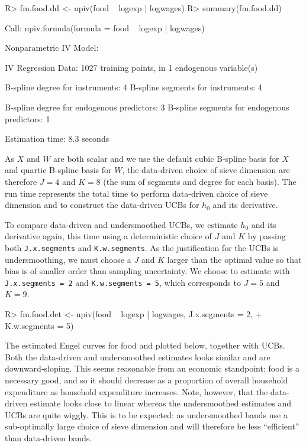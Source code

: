\documentclass[
]{jss}
\begin{document}
\begin{CodeChunk}
\begin{CodeInput}
R> fm.food.dd <- npiv(food ~ logexp | logwages)
R> summary(fm.food.dd)
\end{CodeInput}
\begin{CodeOutput}
Call:
npiv.formula(formula = food ~ logexp | logwages)

Nonparametric IV Model:

IV Regression Data: 1027 training points, in 1 endogenous variable(s)

B-spline degree for instruments:             4
B-spline segments for instruments:           4

B-spline degree for endogenous predictors:   3
B-spline segments for endogenous predictors: 1

Estimation time: 8.3 seconds
\end{CodeOutput}
\end{CodeChunk}

As \(X\) and \(W\) are both scalar and we use the default cubic B-spline
basis for \(X\) and quartic B-spline basis for \(W\), the data-driven
choice of sieve dimension are therefore \(J = 4\) and \(K = 8\) (the sum
of segments and degree for each basis). The run time represents the
total time to perform data-driven choice of sieve dimension and to
construct the data-driven UCBs for \(h_0\) and its derivative.

To compare data-driven and undersmoothed UCBs, we estimate \(h_0\) and
its derivative again, this time using a deterministic choice of \(J\)
and \(K\) by passing both \texttt{J.x.segments} and
\texttt{K.w.segments}. As the justification for the UCBs is
undersmoothing, we must choose a \(J\) and \(K\) larger than the optimal
value so that bias is of smaller order than sampling uncertainty. We
choose to estimate with \texttt{J.x.segments\ =\ 2} and
\texttt{K.w.segments\ =\ 5}, which corresponds to \(J = 5\) and
\(K = 9\).

\begin{CodeChunk}
\begin{CodeInput}
R> fm.food.det <- npiv(food ~ logexp | logwages, J.x.segments = 2, 
+                         K.w.segments = 5)
\end{CodeInput}
\end{CodeChunk}

The estimated Engel curves for food and plotted below, together with
UCBs. Both the data-driven and undersmoothed estimates looks similar and
are downward-sloping. This seems reasonable from an economic standpoint:
food is a necessary good, and so it should decrease as a proportion of
overall household expenditure as household expenditure increases. Note,
however, that the data-driven estimate looks close to linear whereas the
undersmoothed estimates and UCBs are quite wiggly. This is to be
expected: as undersmoothed bands use a sub-optimally large choice of
sieve dimension and will therefore be less ``efficient'' than
data-driven bands.
\end{document}
